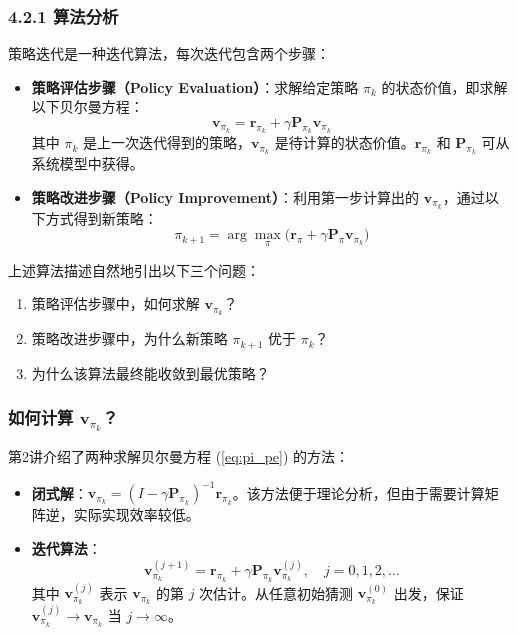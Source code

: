 \documentclass[UTF8]{article}
\begin{document}
\subsubsection*{4.2.1 算法分析}

策略迭代是一种迭代算法，每次迭代包含两个步骤：
\begin{itemize}
    \item \textbf{策略评估步骤（Policy Evaluation）}：求解给定策略 $\pi_k$ 的状态价值，即求解以下贝尔曼方程：
    \begin{equation}
    \boldsymbol{v}_{\pi_k} = \boldsymbol{r}_{\pi_k} + \gamma \boldsymbol{P}_{\pi_k} \boldsymbol{v}_{\pi_k}
    \label{eq:pi_pe}
    \end{equation}
    其中 $\pi_k$ 是上一次迭代得到的策略，$\boldsymbol{v}_{\pi_k}$ 是待计算的状态价值。$\boldsymbol{r}_{\pi_k}$ 和 $\boldsymbol{P}_{\pi_k}$ 可从系统模型中获得。

    \item \textbf{策略改进步骤（Policy Improvement）}：利用第一步计算出的 $\boldsymbol{v}_{\pi_k}$，通过以下方式得到新策略：
    \begin{equation}
    \pi_{k+1} = \arg\max_{\pi} \bigl( \boldsymbol{r}_\pi + \gamma \boldsymbol{P}_\pi \boldsymbol{v}_{\pi_k} \bigr)
    \label{eq:pi_improve}
    \end{equation}
\end{itemize}

上述算法描述自然地引出以下三个问题：
\begin{enumerate}
    \item 策略评估步骤中，如何求解 $\boldsymbol{v}_{\pi_k}$？
    \item 策略改进步骤中，为什么新策略 $\pi_{k+1}$ 优于 $\pi_k$？
    \item 为什么该算法最终能收敛到最优策略？
\end{enumerate}

\subsubsection*{如何计算 $\boldsymbol{v}_{\pi_k}$？}

第2讲介绍了两种求解贝尔曼方程 (\ref{eq:pi_pe}) 的方法：
\begin{itemize}
    \item \textbf{闭式解}：$\boldsymbol{v}_{\pi_k} = (I - \gamma \boldsymbol{P}_{\pi_k})^{-1} \boldsymbol{r}_{\pi_k}$。该方法便于理论分析，但由于需要计算矩阵逆，实际实现效率较低。
    \item \textbf{迭代算法}：
    \begin{equation}
    \boldsymbol{v}_{\pi_k}^{(j+1)} = \boldsymbol{r}_{\pi_k} + \gamma \boldsymbol{P}_{\pi_k} \boldsymbol{v}_{\pi_k}^{(j)}, \quad j = 0, 1, 2, \dots
    \label{eq:pi_iterative_pe}
    \end{equation}
    其中 $\boldsymbol{v}_{\pi_k}^{(j)}$ 表示 $\boldsymbol{v}_{\pi_k}$ 的第 $j$ 次估计。从任意初始猜测 $\boldsymbol{v}_{\pi_k}^{(0)}$ 出发，保证 $\boldsymbol{v}_{\pi_k}^{(j)} \to \boldsymbol{v}_{\pi_k}$ 当 $j \to \infty$。
\end{itemize}
\end{document}
